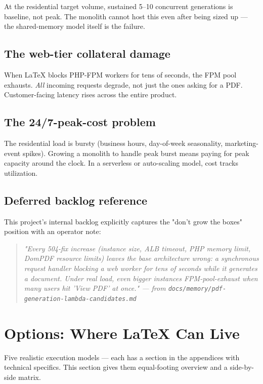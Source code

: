 \documentclass[11pt,letterpaper]{article}
\newenvironment{tradeoffs}
  {\vspace{0.5em}\begin{quote}\small\itshape}
  {\end{quote}\vspace{0.5em}}
\begin{document}
At the residential target volume, sustained 5--10 concurrent generations is baseline, not peak. The monolith cannot host this even after being sized up --- the shared-memory model itself is the failure.

\subsection{The web-tier collateral damage}
When LaTeX blocks PHP-FPM workers for tens of seconds, the FPM pool exhausts. \emph{All} incoming requests degrade, not just the ones asking for a PDF. Customer-facing latency rises across the entire product.

\subsection{The 24/7-peak-cost problem}
The residential load is bursty (business hours, day-of-week seasonality, marketing-event spikes). Growing a monolith to handle peak burst means paying for peak capacity around the clock. In a serverless or auto-scaling model, cost tracks utilization.

\subsection{Deferred backlog reference}
This project's internal backlog explicitly captures the "don't grow the boxes" position with an operator note:

\begin{tradeoffs}
\emph{"Every 504-fix increase (instance size, ALB timeout, PHP memory limit, DomPDF resource limits) leaves the base architecture wrong: a synchronous request handler blocking a web worker for tens of seconds while it generates a document. Under real load, even bigger instances FPM-pool-exhaust when many users hit 'View PDF' at once."} --- from \texttt{docs/memory/pdf-generation-lambda-candidates.md}
\end{tradeoffs}

\newpage

\section{Options: Where LaTeX Can Live}
\label{sec:options}

Five realistic execution models --- each has a section in the appendices with technical specifics. This section gives them equal-footing overview and a side-by-side matrix.
\end{document}
